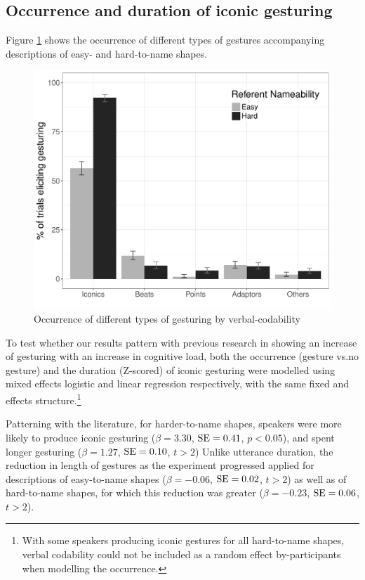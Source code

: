 \documentclass[a4paper,man,natbib]{apa6}
\newcommand{\resultsLog}[3]{$\beta = #1$, $\textnormal{SE} = #2$, $p #3$}
\newcommand{\resultsLM}[3]{$\beta = #1$, $\textnormal{SE} = #2$, $t #3$}
\begin{document}
\subsection{Occurrence and duration of iconic gesturing}
Figure \ref{fig:gtypes} shows the occurrence of different types of gestures accompanying descriptions of easy- and hard-to-name shapes.
\begin{figure}
  \centering
	\includegraphics[width=\linewidth]{prop_plot.pdf}
  \caption{Occurrence of different types of gesturing by verbal-codability}
  \label{fig:gtypes}
\end{figure}

To test whether our results pattern with previous research in showing an increase of gesturing with an increase in cognitive load, both the occurrence (gesture vs.\@ no gesture) and the duration (Z-scored) of iconic gesturing were modelled using mixed effects logistic and linear regression respectively, with the same fixed and effects structure.\footnote{With some speakers producing iconic gestures for all hard-to-name shapes, verbal codability could not be included as a random effect by-participants when modelling the occurrence.}

Patterning with the literature, for harder-to-name shapes, speakers were more likely to produce iconic gesturing (\resultsLog{3.30}{0.41}{<0.05}), and spent longer gesturing (\resultsLM{1.27}{0.10}{>2})
Unlike utterance duration, the reduction in length of gestures as the experiment progressed applied for descriptions of easy-to-name shapes (\resultsLM{-0.06}{0.02}{>2}) as well as of hard-to-name shapes, for which this reduction was greater (\resultsLM{-0.23}{0.06}{>2}).
\end{document}
